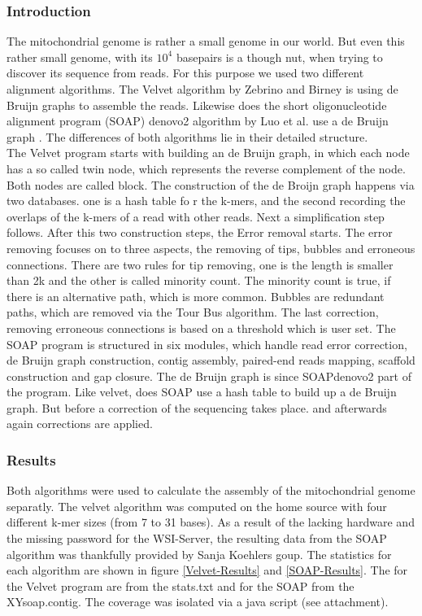 \documentclass[%
   10pt,              %
   ngerman,           %
   a4paper,           %
   DIV11,             %
]{scrartcl}%
\begin{document}
\subsubsection*{Introduction}
The mitochondrial genome is rather a small genome in our world. But even this rather small genome, with its $10^4$ basepairs is a though nut, when trying to discover its sequence from reads. For this purpose we used two different alignment algorithms. The Velvet algorithm by Zebrino and Birney is using de Bruijn graphs to assemble the reads.\cite{VelvetProgram}
Likewise does the short oligonucleotide alignment program (SOAP) denovo2 algorithm by Luo et al. use a de Bruijn graph \cite{SOAP2Program}. The differences of both algorithms lie in their detailed structure.\\
The Velvet program starts with building an de Bruijn graph, in which each node has a so called twin node, which represents the reverse complement of the node. Both nodes are called block. The construction of the de Broijn graph happens via two databases. one is a hash table fo r the k-mers, and the second recording the overlaps of the k-mers of a read with other reads. Next a simplification step follows. After this two construction steps, the Error removal starts. The error removing focuses on to three aspects, the removing of tips, bubbles and erroneous connections. There are two rules for tip removing, one is the length is smaller than 2k and the other is called minority count. The minority count is true, if there is an alternative path, which is more common. Bubbles are redundant paths, which are removed via the Tour Bus algorithm. The last correction, removing erroneous connections is based on a threshold which is user set. \cite{VelvetProgram}
The SOAP program is structured in six modules, which handle read error correction, de Bruijn graph construction, contig assembly, paired-end reads mapping, scaffold construction and gap closure. The de Bruijn graph is since SOAPdenovo2 part of the program.\cite{SOAP2Program} Like velvet, does SOAP use a hash table to build up a de Bruijn graph.\cite{SOAP1Program} But before a correction of the sequencing takes place. and afterwards again corrections are applied.

\subsubsection*{Results}
Both algorithms were used to calculate the assembly of the mitochondrial genome separatly. The velvet algorithm was computed on the home source with four different k-mer sizes (from 7 to 31 bases). As a result of the lacking hardware and the missing password for the WSI-Server, the resulting data from the SOAP algorithm was thankfully provided by Sanja Koehlers goup. The statistics for each algorithm are shown in figure \ref{Velvet-Results} and \ref{SOAP-Results}. The for the Velvet program are from the stats.txt and for the SOAP from the XYsoap.contig. The coverage was isolated via a java script (see attachment).
\end{document}
